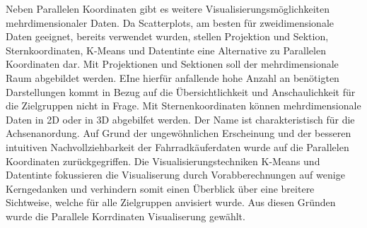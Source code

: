 \documentclass[usegeometry=true]{scrartcl}
\begin{document}
Neben Parallelen Koordinaten gibt es weitere Visualisierungsmöglichkeiten mehrdimensionaler Daten. Da Scatterplots, am besten für zweidimensionale Daten geeignet, bereits verwendet wurden, stellen Projektion und Sektion, Sternkoordinaten, K-Means und Datentinte eine Alternative zu Parallelen Koordinaten dar. Mit Projektionen und Sektionen soll der mehrdimensionale Raum abgebildet werden. EIne hierfür anfallende hohe Anzahl an benötigten Darstellungen kommt in Bezug auf die Übersichtlichkeit und Anschaulichkeit für die Zielgruppen nicht in Frage. Mit Sternenkoordinaten können mehrdimensionale Daten in 2D oder in 3D abgebilfet werden. Der Name ist charakteristisch für die Achsenanordung. Auf Grund der ungewöhnlichen Erscheinung und der besseren intuitiven Nachvollziehbarkeit der Fahrradkäuferdaten wurde auf die Parallelen Koordinaten zurückgegriffen. Die Visualisierungstechniken K-Means und Datentinte fokussieren die Visualiserung durch Vorabberechnungen auf wenige Kerngedanken und verhindern somit einen Überblick über eine breitere Sichtweise, welche für alle Zielgruppen anvisiert wurde. Aus diesen Gründen wurde die Parallele Korrdinaten Visualiserung gewählt. 
\end{document}
